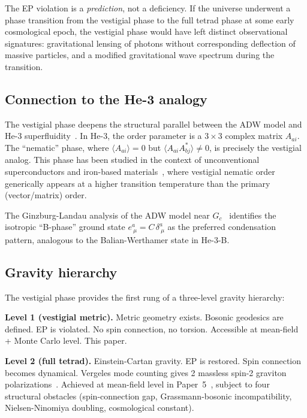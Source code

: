 \documentclass[aps,prd,twocolumn,superscriptaddress,nofootinbib]{revtex4-2}
\newcommand{\vev}[1]{\langle #1 \rangle}
\newcommand{\Gc}{G_c}
\begin{document}
The EP violation is a \emph{prediction}, not a deficiency. If the
universe underwent a phase transition from the vestigial phase to the
full tetrad phase at some early cosmological epoch, the vestigial
phase would have left distinct observational signatures: gravitational
lensing of photons without corresponding deflection of massive
particles, and a modified gravitational wave spectrum during the
transition.

\subsection{Connection to the He-3 analogy}

The vestigial phase deepens the structural parallel between the ADW model
and He-3 superfluidity~\cite{Vollhardt2013}. In He-3, the order parameter
is a $3\times 3$ complex matrix $A_{ai}$. The ``nematic'' phase, where
$\vev{A_{ai}} = 0$ but $\vev{A_{ai}A^*_{bj}} \neq 0$, is precisely
the vestigial analog. This phase has been studied in the context of
unconventional superconductors and iron-based materials~\cite{Fernandes2019},
where vestigial nematic order generically appears at a higher transition
temperature than the primary (vector/matrix) order.

The Ginzburg-Landau analysis of the ADW model near $\Gc$~\cite{Paper5}
identifies the isotropic ``B-phase'' ground state
$e^a_{\ \mu} = C\,\delta^a_{\ \mu}$ as the preferred condensation
pattern, analogous to the Balian-Werthamer state in He-3-B.

\subsection{Gravity hierarchy}

The vestigial phase provides the first rung of a three-level gravity
hierarchy:

\textbf{Level 1 (vestigial metric).} Metric geometry exists. Bosonic
geodesics are defined. EP is violated. No spin connection, no torsion.
Accessible at mean-field + Monte Carlo level. This paper.

\textbf{Level 2 (full tetrad).} Einstein-Cartan gravity. EP is restored.
Spin connection becomes dynamical. Vergeles mode counting gives 2 massless
spin-2 graviton polarizations~\cite{Vergeles2025}. Achieved at mean-field
level in Paper~5~\cite{Paper5}, subject to four structural obstacles
(spin-connection gap, Grassmann-bosonic incompatibility,
Nielsen-Ninomiya doubling, cosmological constant).
\end{document}
